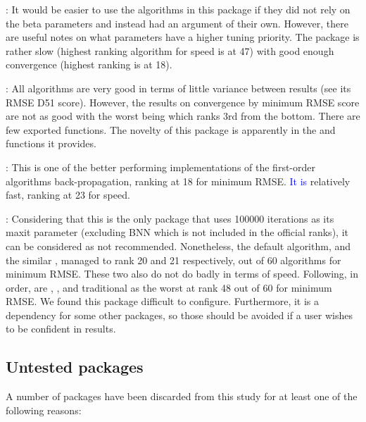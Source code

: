  \citep{R-automl}: It would be easier to use the
algorithms in this package if they did not rely on the beta parameters
and instead had an argument of their own. However, there are useful
notes on what parameters have a higher tuning priority. The package is
rather slow (highest ranking algorithm for speed is  at
47) with good enough convergence (highest ranking is  at 18).

 \citep{R-deepdive}: All algorithms are very good in terms
of little variance between results (see its RMSE D51 score). However,
the results on convergence by minimum RMSE score are not as good with
the worst being  which ranks 3rd from the bottom.
There are few exported functions. The novelty of this package is
apparently in the  and  functions it
provides.

 \citep{R-deepnet}: This is one of the better
performing implementations of the first-order algorithms
back-propagation, ranking at 18 for minimum RMSE.
\textcolor{blue}{It is} relatively fast, ranking at 23 for speed.

 \citep{R-neuralnet}: Considering that this is the
only package that uses 100000 iterations as its maxit parameter
(excluding BNN which is not included in the official ranks), it can be
considered as not recommended. Nonetheless, the default algorithm,
 and the similar , managed to rank 20 and 21
respectively, out of 60 algorithms for minimum RMSE. These two also do
not do badly in terms of speed. Following, in order, are ,
, and traditional  as the worst at rank 48 out
of 60 for minimum RMSE. We found this package difficult to configure.
Furthermore, it is a dependency for some other packages, so those should
be avoided if a user wishes to be confident in results.

\hypertarget{untested-packages}{%
\subsection{Untested packages}\label{untested-packages}}

A number of packages have been discarded from this study for at least
one of the following reasons:

